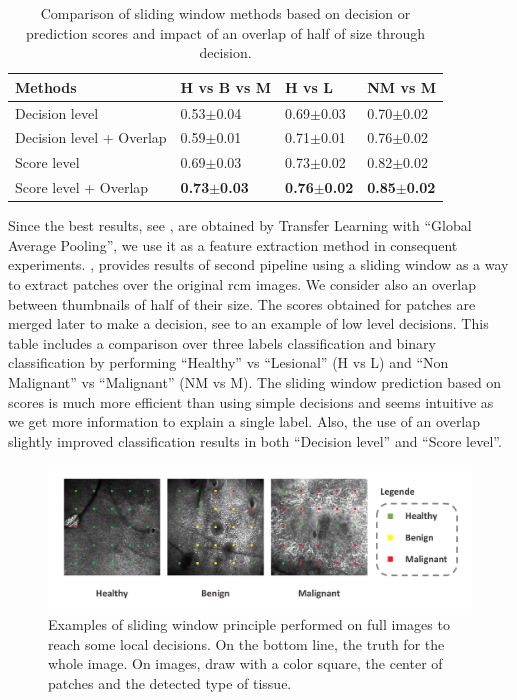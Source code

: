\begin{table}[h]
\centering
    \caption{Comparison of sliding window methods based on decision or prediction scores and impact of an overlap of half of size through decision.}
    \begin{tabular*}{\linewidth}{l@{\extracolsep{\fill}}lll}
        \hline
        \textbf{Methods} & \textbf{H vs B vs M} & \textbf{H vs L} & \textbf{NM vs M}\\
        \hline
        Decision level& 0.53$\pm$0.04 & 0.69$\pm$0.03 & 0.70$\pm$0.02\\
        \hline
        Decision level + Overlap & 0.59$\pm$0.01 & 0.71$\pm$0.01 & 0.76$\pm$0.02\\
        \hline
        Score level& 0.69$\pm$0.03 & 0.73$\pm$0.02 & 0.82$\pm$0.02\\
        \hline
        Score level + Overlap & \textbf{0.73$\pm$0.03} & \textbf{0.76$\pm$0.02} & \textbf{0.85$\pm$0.02}\\
    \end{tabular*}
    \label{sliding_scores}
\end{table}
Since the best results, see , are obtained by Transfer Learning with “Global Average Pooling”, we use it as a feature extraction method in consequent experiments. , provides results of second pipeline using a sliding window as a way to extract patches over the original \ac{rcm} images. We consider also an overlap between thumbnails of half of their size. The scores obtained for patches are merged later to make a decision, see  to an example of low level decisions. This table includes a comparison over three labels classification and binary classification by performing “Healthy” vs “Lesional” (H vs L) and “Non Malignant” vs “Malignant” (NM vs M). The sliding window prediction based on scores is much more efficient than using simple decisions and seems intuitive as we get more information to explain a single label. Also, the use of an overlap slightly improved classification results in both “Decision level” and “Score level”.\par
\begin{figure}[h]
    \begin{center} 
        \includegraphics[width=\linewidth]{content/figures/Detection.pdf}
        \caption{Examples of sliding window principle performed on full images to reach some local decisions. On the bottom line, the truth for the whole image. On images, draw with a color square, the center of patches and the detected type of tissue.}
        \label{detection}
    \end{center} 
\end{figure}
